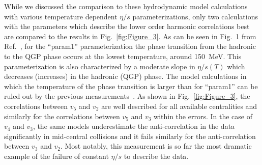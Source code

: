 While we discussed the comparison to these hydrodynamic model calculations with various temperature dependent $\eta/s$ parameterizations, only two calculations with the parameters which describe the lower order harmonic correlations best are compared to the results in Fig.~\ref{fig:Figure_3}. 
As can be seen in Fig.~1 from Ref.~\cite{Niemi:2015qia}, for the ``param1'' parameterization the phase transition from the hadronic to the QGP phase occurs at the lowest temperature, around 150~MeV. This parameterization is also characterized by a moderate slope in $\eta/s(T)$ which decreases (increases) in the hadronic (QGP) phase.
The model calculations in which the temperature of the phase transition is larger than for ``param1'' can be ruled out by the previous measurements~\cite{ALICE:2016kpq}.
As shown in Fig.~\ref{fig:Figure_3}, the correlations between $v_5$ and $v_2$ are well described for all available centralities and similarly for the correlations between $v_5$ and $v_3$ within the errors.
In the case of $v_4$ and $v_3$, the same models underestimate the anti-correlation in the data significantly in mid-central collisions and it fails similarly for the anti-correlation between $v_3$ and $v_2$.
Most notably, this measurement is so far the most dramatic example of the failure of constant $\eta/s$ to describe the data.

